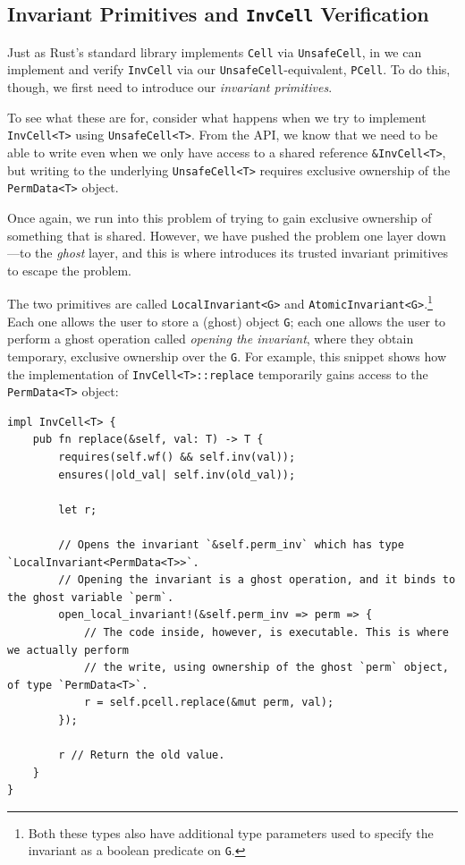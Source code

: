 
\subsection{Invariant Primitives and \texttt{InvCell} Verification} \label{sec:invcell}

Just as Rust's standard library implements \verb`Cell` via \verb`UnsafeCell`,
in \verus we can implement and verify \verb`InvCell` via our 
\verb`UnsafeCell`-equivalent, \verb`PCell`.
To do this, though, we first need to introduce our \emph{invariant primitives}.

To see what these are for, consider what happens when we
try to implement \verb`InvCell<T>` using \verb`UnsafeCell<T>`.
From the API, we know that we need to be able to write
even when we only have access to a shared reference \verb`&InvCell<T>`,
but writing to the underlying \verb`UnsafeCell<T>` requires exclusive ownership
of the \verb`PermData<T>` object.

Once again, we run into this problem of trying to gain exclusive ownership of something
that is shared. However, we have pushed the problem one layer down---to the \emph{ghost}
layer, and this is where \verus introduces its trusted invariant primitives to escape
the problem.

The two primitives are called \verb`LocalInvariant<G>` and
\verb`AtomicInvariant<G>`.\footnote{Both these types also have additional type parameters used to specify the invariant as a boolean predicate on \texttt{G}.}
Each one allows the user to store a (ghost) object \verb`G`; each one allows the user to perform
a ghost operation called \emph{opening the invariant}, where they obtain temporary, exclusive
ownership over the \verb`G`. For example, this snippet shows how the implementation of
\verb`InvCell<T>::replace` temporarily gains access to the \verb`PermData<T>` object:

\begin{lstlisting}[language=Verus,style=VerusLineNos]
impl InvCell<T> {
    pub fn replace(&self, val: T) -> T {
        requires(self.wf() && self.inv(val));
        ensures(|old_val| self.inv(old_val));

        let r;

        // Opens the invariant `&self.perm_inv` which has type `LocalInvariant<PermData<T>>`.
        // Opening the invariant is a ghost operation, and it binds to the ghost variable `perm`.
        open_local_invariant!(&self.perm_inv => perm => {
            // The code inside, however, is executable. This is where we actually perform
            // the write, using ownership of the ghost `perm` object, of type `PermData<T>`.
            r = self.pcell.replace(&mut perm, val);
        });

        r // Return the old value.
    }
}
\end{lstlisting}

